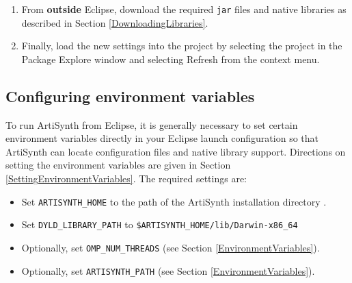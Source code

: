 \documentclass{article}
\def\SEP{/}
\def\ARCH{Darwin-x86\_64 }
\def\directory{directory }
\begin{document}
\begin{enumerate}
\begin{sideblock}
{\bf Attention MacOS users:}\\[0.5em]
The default zip utility on MacOS will create a new sub-folder called 
{\tt eclipseSettings} and will extract the files there.  
\emph{You do not want this!!}
Some of the files are then labelled as ``hidden'' by MacOS, which will
prevent you from moving them to the correct place manually. 
Either extract the file directly to the {\tt\$ARTISYNTH\_HOME} directory 
with a more standard application like {-Zip} ({\sf 7zX} for OSX), 
or use the {\tt unzip} utility from the command-line. For the latter,
open a terminal window, change to the ArtiSynth install directory,
enter the command
\begin{verbatim}
  unzip support/eclipse/eclipseSettings.zip
\end{verbatim}
and respond with {\tt y} when asked if it is OK to replace {\tt .project}.
\end{sideblock}

\item From {\bf outside} Eclipse, download
the required {\tt jar}
files and native libraries as described in Section \ref{DownloadingLibraries}.

\item Finally, load the new settings into the project by selecting the
project in the {\sf Package Explore} window and selecting {\sf
Refresh} from the context menu.

\end{enumerate}

\subsection{Configuring environment variables}
\label{EclipseEnvironmentVariables}

To run ArtiSynth from Eclipse, it is generally necessary to set certain
environment variables directly in your Eclipse launch configuration so
that ArtiSynth can locate configuration files and native library
support. Directions on setting the environment variables are given
in Section \ref{SettingEnvironmentVariables}. The required
settings are:

\begin{itemize}

\item Set {\tt ARTISYNTH\_HOME} to the path of the ArtiSynth
installation \directory.

\item Set {\tt DYLD\_LIBRARY\_PATH} to {\tt \$ARTISYNTH\_HOME\SEP lib\SEP \ARCH}

\item Optionally, set {\tt OMP\_NUM\_THREADS} (see Section
\ref{EnvironmentVariables}).

\item Optionally, set {\tt ARTISYNTH\_PATH} 
(see Section \ref{EnvironmentVariables}).

\end{itemize}
\end{document}

